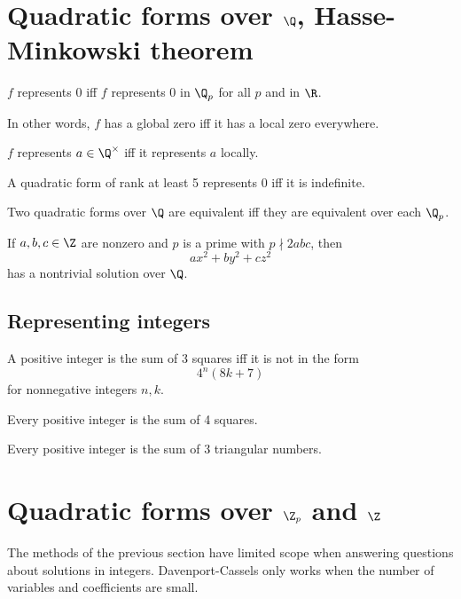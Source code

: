 \section{Quadratic forms over $\Q$, Hasse-Minkowski theorem}
\begin{thm}
$f$ represents 0 iff $f$ represents 0 in $\Q_p$ for all $p$ and in $\R$.
\end{thm}
In other words, $f$ has a global zero iff it has a local zero everywhere.
\begin{cor}
$f$ represents $a\in \Q^{\times}$ iff it represents $a$ locally.
\end{cor}
\begin{cor}
A quadratic form of rank at least 5 represents 0 iff it is indefinite.
\end{cor}
\begin{thm}
Two quadratic forms over $\Q$ are equivalent iff they are equivalent over each $\Q_p$.
\end{thm}
\begin{pr}
If $a,b,c\in \Z$ are nonzero and $p$ is a prime with $p\nmid 2abc$, then
\[
ax^2+by^2+cz^2
\]
has a nontrivial solution over $\Q$.
\end{pr}
\subsection{Representing integers}
\begin{thm}[Gauss]
A positive integer is the sum of 3 squares iff it is not in the form
\[
4^n(8k+7)
\]
for nonnegative integers $n,k$.
\end{thm}
\begin{thm}

\end{thm}
\begin{thm}[Lagrange]
Every positive integer is the sum of 4 squares.
\end{thm}
\begin{thm}[Gauss]
Every positive integer is the sum of 3 triangular numbers.
\end{thm}
\section{Quadratic forms over $\Z_p$ and $\Z$}
The methods of the previous section have limited scope when answering questions about solutions in integers. Davenport-Cassels only works when the number of variables and coefficients are small.
